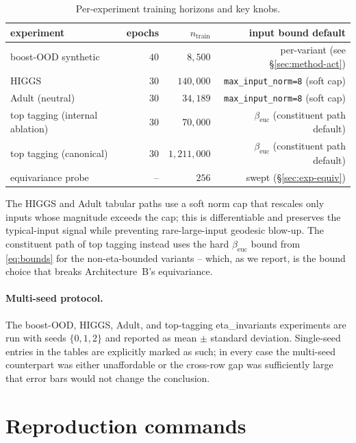 \documentclass[11pt]{article}
\begin{document}
\begin{table}[h]
  \centering
  \caption{Per-experiment training horizons and key knobs.}
  \label{tab:hp}
  \begin{tabular}{lrrr}
    \toprule
    experiment & epochs & $n_\text{train}$ & input bound default \\
    \midrule
    boost-OOD synthetic   & $40$ & $8{,}500$    & per-variant (see \S\ref{sec:method-act}) \\
    HIGGS                 & $30$ & $140{,}000$  & \texttt{max\_input\_norm=8} (soft cap) \\
    Adult (neutral)       & $30$ & $34{,}189$   & \texttt{max\_input\_norm=8} (soft cap) \\
    top tagging (internal ablation) & $30$ & $70{,}000$ & $\beta_{\text{euc}}$ (constituent path default) \\
    top tagging (canonical)         & $30$ & $1{,}211{,}000$ & $\beta_{\text{euc}}$ (constituent path default) \\
    equivariance probe    & --   & $256$        & swept (\S\ref{sec:exp-equiv}) \\
    \bottomrule
  \end{tabular}
\end{table}

The HIGGS and Adult tabular paths use a soft norm cap that rescales
only inputs whose magnitude exceeds the cap; this is differentiable and
preserves the typical-input signal while preventing rare-large-input
geodesic blow-up. The constituent path of top tagging instead uses the
hard $\beta_{\text{euc}}$ bound from \eqref{eq:bounds} for the
non-eta-bounded variants -- which, as we report, is the bound choice
that breaks Architecture~B's equivariance.

\paragraph{Multi-seed protocol.} The boost-OOD, HIGGS, Adult, and
top-tagging eta\_invariants experiments are run with seeds $\{0, 1, 2\}$
and reported as mean $\pm$ standard deviation. Single-seed entries in
the tables are explicitly marked as such; in every case the multi-seed
counterpart was either unaffordable or the cross-row gap was
sufficiently large that error bars would not change the conclusion.

\section{Reproduction commands}
\label{app:repro}
\end{document}
